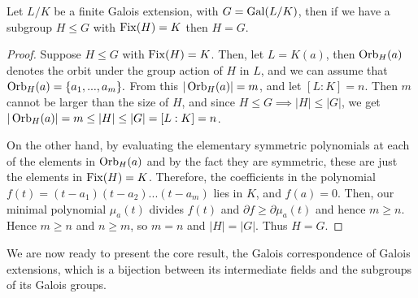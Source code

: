 

\begin{theorem}\label{thm:equal-subgroup-fixed-points}
    Let $L/K$ be a finite Galois extension, with $G=\operatorname{Gal}(L/K)$, then if we have a subgroup $H\leq G$ with $\operatorname{Fix}(H)=K$ then $H=G$.
\end{theorem}

\begin{proof}
    Suppose $H\leq G$ with $\operatorname{Fix}(H)=K$. Then, let $L = K(a)$, then $\operatorname{Orb}_H(a)$ denotes the orbit under the group action of $H$ in $L$, and we can assume that $\operatorname{Orb}_H(a) = \{a_1,...,a_m\}.$ From this $|\operatorname{Orb}_H(a)| = m$, and let $[L:K]=n$.
    Then $m$ cannot be larger than the size of $H$, and since $H\leq G \implies |H|\leq|G|$, we get $|\operatorname{Orb}_H(a)| = m \leq |H| \leq |G| = [L:K] = n$.
    
   
    On the other hand, by evaluating the elementary symmetric polynomials at each of the elements in $\operatorname{Orb}_H(a)$ and by the fact they are symmetric, these are just the elements in $\operatorname{Fix}(H)=K$. Therefore, the coefficients in the polynomial $f(t) = (t-a_1)(t-a_2)...(t-a_m)$ lies in $K$, and $f(a)=0$. Then, our minimal polynomial $\mu_a(t)$ divides $f(t)$ and $\partial f \geq \partial \mu_a(t)$ and hence $m \geq n$. Hence  $m \geq n$ and $n \geq m$, so  $m=n$ and $|H|=|G|$. Thus $H=G.$
\end{proof}

We are now ready to present the core result, the Galois correspondence of Galois extensions, which is a bijection between its intermediate fields and the subgroups of its Galois groups. 

